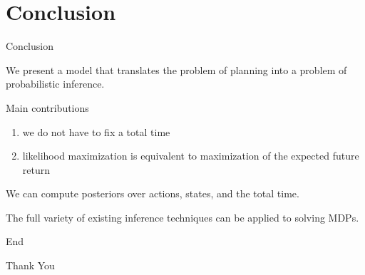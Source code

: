 \documentclass[handout]{beamer}
\theoremstyle{definition}
\begin{document}
\section{Conclusion}
\begin{frame}{Conclusion}
	\begin{block}{}
	    We present a model that translates the problem of planning into a problem of probabilistic inference.
	\end{block}
	\pause
	\begin{block}{Main contributions}
	     \begin{enumerate}
	         \item we do not have to fix a total time
	         \item likelihood maximization is equivalent to maximization of the expected future return
 	   \end{enumerate}
	\end{block}
	\pause
	\begin{block}{}
	     We can compute posteriors over actions, states, and the total time.
	\end{block}
	\pause
	\begin{block}{}
	     The full variety of existing inference techniques can be applied to solving MDPs.
	\end{block}
\end{frame}

\begin{frame}{End}
	\begin{center}
		{\Huge\calligra Thank You}
	\end{center}
\end{frame}
\end{document}
